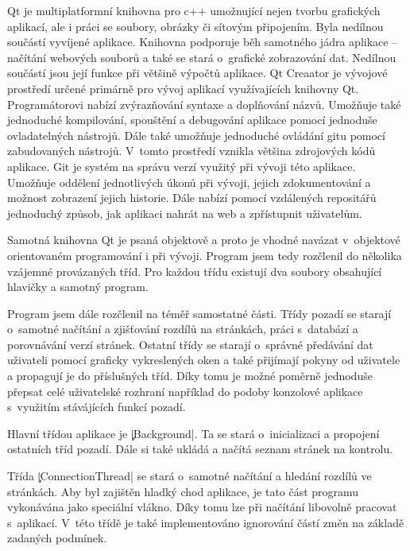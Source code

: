 
Qt je multiplatformní knihovna pro c++ umožnující nejen tvorbu grafických aplikací, ale i práci se soubory, obrázky či sítovým připojením.
Byla nedílnou součástí vyvíjené aplikace.
Knihovna podporuje běh samotného jádra aplikace -- načítání webových souborů a také se stará o~grafické zobrazování dat.
Nedílnou součástí jsou její funkce při většině výpočtů aplikace.
Qt Creaator je vývojové prostředí určené primárně pro vývoj aplikací využívajících knihovny Qt.
Programátorovi nabízí zvýrazňování syntaxe a doplňování názvů.
Umožňuje také jednoduché kompilování, spouštění a debugování aplikace pomocí jednoduše ovladatelných nástrojů.
Dále také umožňuje jednoduché ovládání gitu pomocí zabudovaných nástrojů.
V~tomto prostředí vznikla většina zdrojových kódů aplikace.
Git je systém na správu verzí využitý při vývoji této aplikace.
Umožňuje oddělení jednotlivých úkonů při vývoji, jejich zdokumentování a možnost zobrazení jejich historie.
Dále nabízí pomocí vzdálených repositářů jednoduchý způsob, jak aplikaci nahrát na web a zpřístupnit uživatelům.

	Samotná knihovna Qt je psaná objektově a proto je vhodné navázat v~objektové orientovaném programování i při vývoji.
	Program jsem tedy rozčlenil do několika vzájemné provázaných tříd.
	Pro každou třídu existují dva soubory obsahující hlavičky a samotný program.

	Program jsem dále rozčlenil na téměř samostatné části.
	Třídy pozadí se starají o~samotné načítání a zjišťování rozdílů na stránkách, práci s~databází a porovnávání verzí stránek.
	Ostatní třídy se starají o~správné předávání dat uživateli pomocí graficky vykreslených oken a také přijímají pokyny od uživatele a propagují je do příslušných tříd.
	Díky tomu je možné poměrně jednoduše přepsat celé uživatelské rozhraní například do podoby konzolové aplikace s~využitím stávájících funkcí pozadí.


Hlavní třídou aplikace je \c|Background|. Ta se stará o~inicializaci a propojení ostatních tříd pozadí.
Dále si také ukládá a načítá seznam stránek na kontrolu.

Třída \c|ConnectionThread| se stará o~samotné načítání a hledání rozdílů ve stránkách. Aby byl zajištěn hladký chod aplikace, je tato část programu vykonávána jako speciální vlákno. %
Díky tomu lze při načítání libovolně pracovat s~aplikací.
V~této třídě je také implementováno ignorování částí změn na základě zadaných podmínek.

